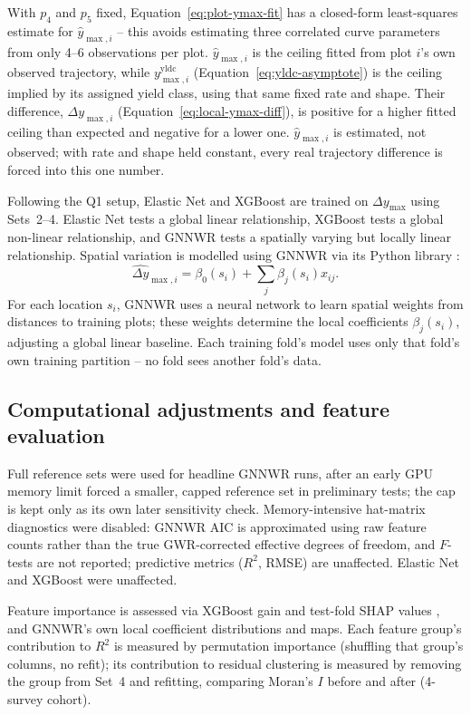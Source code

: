 With $p_4$ and $p_5$ fixed, Equation~\eqref{eq:plot-ymax-fit} has a closed-form least-squares estimate for $\hat y_{\max,i}$ -- this avoids estimating three correlated curve parameters from only 4--6 observations per plot. $\hat y_{\max,i}$ is the ceiling fitted from plot $i$'s own observed trajectory, while $y_{\max,i}^{\mathrm{yldc}}$ (Equation~\eqref{eq:yldc-asymptote}) is the ceiling implied by its assigned yield class, using that same fixed rate and shape. Their difference, $\Delta y_{\max,i}$ (Equation~\eqref{eq:local-ymax-diff}), is positive for a higher fitted ceiling than expected and negative for a lower one. $\hat y_{\max,i}$ is estimated, not observed; with rate and shape held constant, every real trajectory difference is forced into this one number.

Following the Q1 setup, Elastic Net and XGBoost are trained on $\Delta y_{\max}$ using Sets~2--4. Elastic Net tests a global linear relationship, XGBoost tests a global non-linear relationship, and GNNWR tests a spatially varying but locally linear relationship. Spatial variation is modelled using GNNWR via its Python library \cite{du2020Geographically_C6_GWR, du2022PyGNNWR_C6_GWR}:
\begin{equation}
\widehat{\Delta y}_{\max,i} = \beta_0(s_i) + \sum_j \beta_j(s_i) x_{ij}.
\label{eq:gnnwr}
\end{equation}
For each location $s_i$, GNNWR uses a neural network to learn spatial weights from distances to training plots; these weights determine the local coefficients $\beta_j(s_i)$, adjusting a global linear baseline. Each training fold's model uses only that fold's own training partition -- no fold sees another fold's data.

\subsection*{Computational adjustments and feature evaluation}
Full reference sets were used for headline GNNWR runs, after an early GPU memory limit forced a smaller, capped reference set in preliminary tests; the cap is kept only as its own later sensitivity check. Memory-intensive hat-matrix diagnostics were disabled: GNNWR AIC is approximated using raw feature counts rather than the true GWR-corrected effective degrees of freedom, and $F$-tests are not reported; predictive metrics ($R^2$, RMSE) are unaffected. Elastic Net and XGBoost were unaffected. %

Feature importance is assessed via XGBoost gain and test-fold SHAP values \cite{lundberg2017Unified_C7_XAI}, and GNNWR's own local coefficient distributions and maps.
Each feature group's contribution to $R^2$ is measured by permutation importance (shuffling that group's columns, no refit); its contribution to residual clustering is measured by removing the group from Set~4 and refitting, comparing Moran's $I$ before and after (4-survey cohort).

